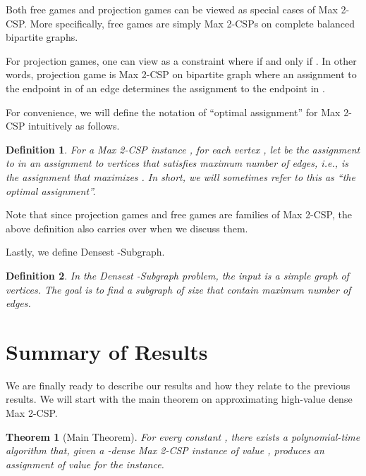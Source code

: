 \documentclass{article}
\newtheorem{theorem}{Theorem}
\newtheorem{definition}{Definition}
\begin{document}
Both free games and projection games can be viewed as special cases of {\sc Max 2-CSP}. More specifically, free games are simply Max 2-CSPs on complete balanced bipartite graphs.

For projection games, one can view  as a constraint  where  if and only if . In other words, projection game is {\sc Max 2-CSP} on bipartite graph where an assignment to the endpoint in  of an edge determines the assignment to the endpoint in .

For convenience, we will define the notation of ``optimal assignment'' for {\sc Max 2-CSP} intuitively as follows. \\

\begin{definition}
For a {\sc Max 2-CSP} instance , for each vertex , let  be the assignment to  in an assignment to vertices that satisfies maximum number of edges, i.e.,  is the assignment that maximizes . In short, we will sometimes refer to this as ``the optimal assignment''.
\end{definition}

Note that since projection games and free games are families of {\sc Max 2-CSP}, the above definition also carries over when we discuss them.

Lastly, we define {\sc Densest -Subgraph}. \\

\begin{definition}
In the {\sc Densest -Subgraph} problem, the input is a simple graph  of  vertices. The goal is to find a subgraph of size  that contain maximum number of edges.
\end{definition}

\section{Summary of Results}\label{s:results}

We are finally ready to describe our results and how they relate to the previous results. We will start with the main theorem on approximating high-value dense {\sc Max 2-CSP}. \\

\begin{theorem}[Main Theorem] \label{thm:main}
  For every constant , there exists a polynomial-time algorithm that, given a -dense {\sc Max 2-CSP} instance of value , produces an assignment of value  for the instance.
\end{theorem}
\end{document}
